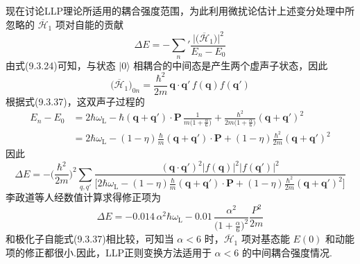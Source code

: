现在讨论LLP理论所适用的耦合强度范围，为此利用微扰论估计上述变分处理中所忽略的 $\overline{\mathscr{H}}_{1}$ 项对自能的贡献
\begin{equation}
  \Delta E=-{\sum_{n}}'
  \frac{\bigl|\bigl(\overline{\mathscr{H}}_{1}\bigr)\bigr|^{2}}{E_{n}-E_{0}}
\end{equation}
由式(9.3.24)可知，与状态 $|0\rangle$ 相耦合的中间态是产生两个虚声子状态，因此
\begin{equation}
  \bigl(\overline{\mathscr{H}}_{1}\bigr)_{0n}
  =\frac{\hbar^{2}}{2m}\,\boldsymbol{q}\cdot\boldsymbol{q}'\,
  f(\boldsymbol{q})f(\boldsymbol{q}')
\end{equation}
根据式(9.3.37)，这双声子过程的
\begin{equation}
\begin{aligned}
  E_{n}-E_{0}&=2\hbar\omega_{\mathrm L}
  -\hbar(\boldsymbol{q}+\boldsymbol{q}')\cdot\boldsymbol{P}\,
  \frac{1}{m\bigl(1+\frac{\alpha}{6}\bigr)}
  +\frac{\hbar^{2}}{2m\bigl(1+\frac{\alpha}{6}\bigr)}
  (\boldsymbol{q}+\boldsymbol{q}')^{2}\\
  &=2\hbar\omega_{\mathrm L}
  -(1-\eta)\frac{\hbar}{m}(\boldsymbol{q}+\boldsymbol{q}')\cdot\boldsymbol{P}
  +(1-\eta)\frac{\hbar^{2}}{2m}(\boldsymbol{q}+\boldsymbol{q}')^{2}
\end{aligned}
\end{equation}
因此
\begin{equation}
  \Delta E=-\biggl(\frac{\hbar^{2}}{2m}\biggr)^{2}\sum_{q,q'}
  \frac{(\boldsymbol{q}\cdot\boldsymbol{q}')^{2}
  \bigl|f(\boldsymbol{q})\bigr|^{2}\bigl|f(\boldsymbol{q}')\bigr|^{2}}
  {\bigl[2\hbar\omega_{\mathrm L}-(1-\eta)\frac{\hbar}{m}
  (\boldsymbol{q}+\boldsymbol{q}')\cdot\boldsymbol{P}
  +(1-\eta)\frac{\hbar^{2}}{2m}(\boldsymbol{q}+\boldsymbol{q}')^{2}\bigr]}
\end{equation}
李政道等人经数值计算求得修正项为
\begin{equation}
  \Delta E=-0.014\,\alpha^{2}\hbar\omega_{\mathrm L}
  -0.01\,\frac{\alpha^{2}}{\bigl(1+\frac{\alpha}{6}\bigr)^{2}}
  \frac{P^{2}}{2m}
\end{equation}
和极化子自能式(9.3.37)相比较，可知当 $\alpha<6$ 时，$\overline{\mathscr{H}}_{1}$ 项对基态能 $E(0)$ 和动能项的修正都很小.因此，LLP正则变换方法适用于 $\alpha<6$ 的中间耦合强度情况.

